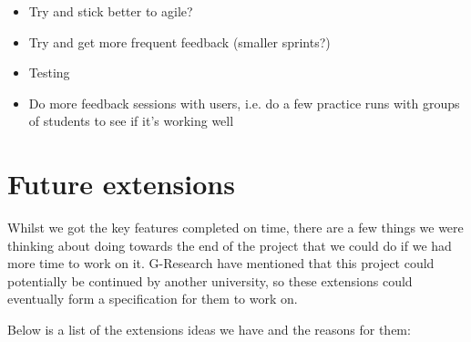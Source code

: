 \begin{itemize}
    \item
        Try and stick better to agile?
    \item
        Try and get more frequent feedback (smaller sprints?)
    \item
        Testing
    \item
        Do more feedback sessions with users, i.e. do a few practice runs with
        groups of students to see if it's working well
\end{itemize}

\section{Future extensions}

Whilst we got the key features completed on time, there are a few things we were 
thinking about doing towards the end of the project that we could do if we had
more time to work on it. G-Research have mentioned that this project could
potentially be continued by another university, so these extensions could
eventually form a specification for them to work on.

Below is a list of the extensions ideas we have and the reasons for them:

